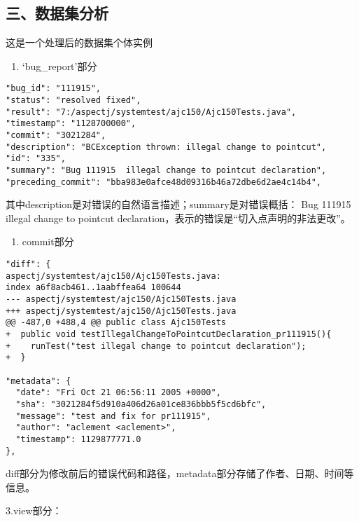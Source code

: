 \documentclass[12pt]{article}
\begin{document}
\subsection*{三、数据集分析}
这是一个处理后的数据集个体实例

\begin{enumerate}
      \item
            `bug\_report'部分
\end{enumerate}

\begin{lstlisting}
"bug_id": "111915",
"status": "resolved fixed",
"result": "7:/aspectj/systemtest/ajc150/Ajc150Tests.java",
"timestamp": "1128700000",
"commit": "3021284",
"description": "BCException thrown: illegal change to pointcut",
"id": "335",
"summary": "Bug 111915  illegal change to pointcut declaration",
"preceding_commit": "bba983e0afce48d09316b46a72dbe6d2ae4c14b4",
\end{lstlisting}

其中\textquotesingle description\textquotesingle 是对错误的自然语言描述；\textquotesingle summary\textquotesingle 是对错误概括：
\textquotesingle Bug 111915 illegal change to pointcut declaration\textquotesingle，表示的错误是“切入点声明的非法更改”。

\begin{enumerate}[resume]
      \item
            \textquotesingle commit\textquotesingle 部分
\end{enumerate}

\begin{lstlisting}
"diff": {
aspectj/systemtest/ajc150/Ajc150Tests.java:
index a6f8acb461..1aabffea64 100644
--- aspectj/systemtest/ajc150/Ajc150Tests.java
+++ aspectj/systemtest/ajc150/Ajc150Tests.java
@@ -487,0 +488,4 @@ public class Ajc150Tests
+  public void testIllegalChangeToPointcutDeclaration_pr111915(){
+    runTest("test illegal change to pointcut declaration");
+  }

"metadata": {
  "date": "Fri Oct 21 06:56:11 2005 +0000",
  "sha": "3021284f5d910a406d26a01ce836bbb5f5cd6bfc",
  "message": "test and fix for pr111915",
  "author": "aclement <aclement>",
  "timestamp": 1129877771.0
},
\end{lstlisting}
\textquotesingle diff\textquotesingle 部分为修改前后的错误代码和路径，\textquotesingle metadata\textquotesingle 部分存储了作者、日期、时间等信息。

3.\textquotesingle view\textquotesingle 部分：
\end{document}
